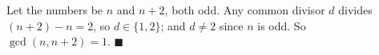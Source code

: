 Let the numbers be $n$ and $n+2$, both odd. Any common divisor $d$ divides $(n+2)-n=2$, so $d\in\{1,2\}$; and $d\ne2$ since $n$ is odd. So $\gcd(n,n+2)=1$. $\blacksquare$
